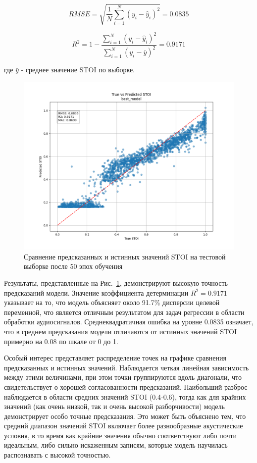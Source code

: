 \documentclass[oneside, final, 14pt]{extarticle}
\begin{document}
\begin{equation}
RMSE = \sqrt{\frac{1}{N}\sum_{i=1}^N(y_i - \hat{y}_i)^2} = 0.0835
\end{equation}

\begin{equation}
R^2 = 1 - \frac{\sum_{i=1}^N(y_i - \hat{y}_i)^2}{\sum_{i=1}^N(y_i - \bar{y})^2} = 0.9171
\end{equation}

где $\bar{y}$ - среднее значение STOI по выборке.

\begin{figure}[]
\centering
\includegraphics[width=0.85\linewidth]{best_model_scatter.png}
\caption{Сравнение предсказанных и истинных значений STOI на тестовой выборке после 50 эпох обучения}
\label{fig:stoi_pred}
\end{figure}

Результаты, представленные на Рис.~\ref{fig:stoi_pred}, демонстрируют высокую точность предсказаний модели. Значение коэффициента детерминации $R^2=0.9171$ указывает на то, что модель объясняет около 91.7\% дисперсии целевой переменной, что является отличным результатом для задач регрессии в области обработки аудиосигналов. Среднеквадратичная ошибка на уровне 0.0835 означает, что в среднем предсказания модели отличаются от истинных значений STOI примерно на 0.08 по шкале от 0 до 1.

Особый интерес представляет распределение точек на графике сравнения предсказанных и истинных значений. Наблюдается четкая линейная зависимость между этими величинами, при этом точки группируются вдоль диагонали, что свидетельствует о хорошей согласованности предсказаний. Наибольший разброс наблюдается в области средних значений STOI (0.4-0.6), тогда как для крайних значений (как очень низкой, так и очень высокой разборчивости) модель демонстрирует особо точные предсказания. Это может быть объяснено тем, что средний диапазон значений STOI включает более разнообразные акустические условия, в то время как крайние значения обычно соответствуют либо почти идеальным, либо сильно искаженным записям, которые модель научилась распознавать с высокой точностью.
\end{document}

